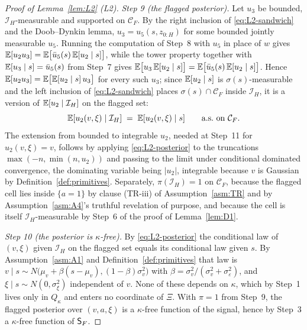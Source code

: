 \begin{proof}[Proof of Lemma~\ref{lem:L2} (L2)]
\emph{Step 9 (the flagged posterior).} Let $u_3$ be bounded, $\mathcal I_H$-measurable and supported
on $\mathcal C_F$. By the right inclusion of \eqref{eq:L2-sandwich} and the Doob--Dynkin lemma,
$u_3 = u_5(s,z_{0:H})$ for some bounded jointly measurable $u_5$. Running the computation of Step~8
with $u_5$ in place of $w$ gives $\mathbb{E}[u_2u_3] = \mathbb{E}\bigl[\bar u_5(s)\,\mathbb{E}[u_2 \mid s]\bigr]$,
while the tower property together with $\mathbb{E}[u_3 \mid s] = \bar u_5(s)$ from Step~7 gives
$\mathbb{E}\bigl[u_3\,\mathbb{E}[u_2 \mid s]\bigr] = \mathbb{E}\bigl[\bar u_5(s)\,\mathbb{E}[u_2 \mid s]\bigr]$. Hence
$\mathbb{E}[u_2u_3] = \mathbb{E}\bigl[\mathbb{E}[u_2 \mid s]\,u_3\bigr]$ for every such $u_3$; since
$\mathbb{E}[u_2 \mid s]$ is $\sigma(s)$-measurable and the left inclusion of \eqref{eq:L2-sandwich} places
$\sigma(s) \cap \mathcal C_F$ inside $\mathcal I_H$, it is a version of $\mathbb{E}[u_2 \mid \mathcal I_H]$
on the flagged set:
\begin{equation}
\label{eq:L2-posterior}
\mathbb{E}[u_2(v,\xi) \mid \mathcal I_H] \;=\; \mathbb{E}[u_2(v,\xi) \mid s]
 \qquad \text{a.s.\ on } \mathcal C_F .
\end{equation}
The extension from bounded to integrable $u_2$, needed at Step~11 for $u_2(v,\xi) = v$, follows by
applying \eqref{eq:L2-posterior} to the truncations $\max(-n,\min(n,u_2))$ and passing to the limit
under conditional dominated convergence, the dominating variable being $|u_2|$, integrable because
$v$ is Gaussian by Definition~\ref{def:primitives}. Separately, $\pi(\mathcal I_H) = 1$ on
$\mathcal C_F$, because the flagged cell lies inside $\{a=1\}$ by clause (TR-iii) of
Assumption~\ref{asm:TR} and by Assumption~\ref{asm:A4}'s truthful revelation of purpose, and because
the cell is itself $\mathcal I_H$-measurable by Step~6 of the proof of Lemma~\ref{lem:D1}.

\emph{Step 10 (the posterior is $\kappa$-free).} By \eqref{eq:L2-posterior} the conditional law of
$(v,\xi)$ given $\mathcal I_H$ on the flagged set equals its conditional law given $s$. By
Assumption~\ref{asm:A1} and Definition~\ref{def:primitives} that law is
$v \mid s \sim N\bigl(\mu_v+\beta(s-\mu_v),(1-\beta)\sigma_v^2\bigr)$ with
$\beta = \sigma_v^2/(\sigma_v^2+\sigma_\varepsilon^2)$, and $\xi \mid s \sim N(0,\sigma_\xi^2)$
independent of $v$. None of these depends on $\kappa$, which by Step~1 lives only in $Q_\kappa$ and
enters no coordinate of $\Xi$. With $\pi = 1$ from Step~9, the flagged posterior over $(v,a,\xi)$ is
a $\kappa$-free function of the signal, hence by Step~3 a $\kappa$-free function of $\mathsf{S}_F$.


\end{proof}
